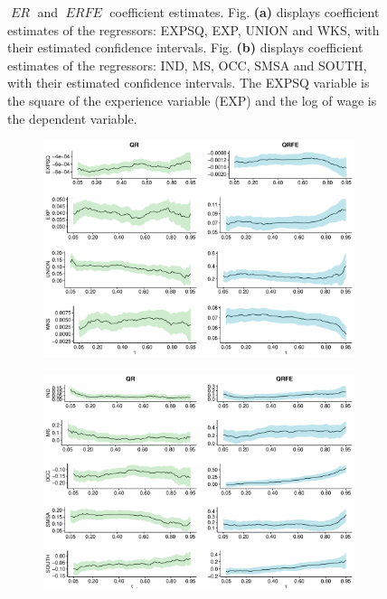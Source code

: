 \documentclass[15pt,a4paper]{article}
\DeclareMathOperator{\ERFE}{\textit{ERFE}}
\DeclareMathOperator{\ER}{\textit{ER}}
\begin{document}
\begin{figure}
\begin{subfigure}[b]{0.49\textwidth}
         \caption{}
         \label{fig:cross1_er_erfe2}
     \end{subfigure}
       \caption{ $\ER$ and $\ERFE$ coefficient estimates. Fig. \textbf{(a)} displays coefficient estimates of the regressors: EXPSQ, EXP, UNION and WKS, with their estimated confidence intervals. Fig. \textbf{(b)} displays coefficient estimates of the regressors: IND, MS, OCC, SMSA and SOUTH, with their estimated confidence intervals. The EXPSQ variable is the square of the experience variable (EXP) and the log of wage is the dependent variable.}
        \label{fig:cross1_er_erfe}
\end{figure}


\begin{figure}
     \centering
     \begin{subfigure}[b]{0.49\textwidth}
         \centering
         \includegraphics[width=\textwidth]{Graph_main/cross1_qr_qrfe1}
         \caption{}
         \label{fig:cross1_qr_qrfe1}
     \end{subfigure}
     \hfill
     \begin{subfigure}[b]{0.49\textwidth}
         \centering
         \includegraphics[width=\textwidth]{Graph_main/cross1_qr_qrfe2}

\end{subfigure}
\end{figure}
\end{document}
